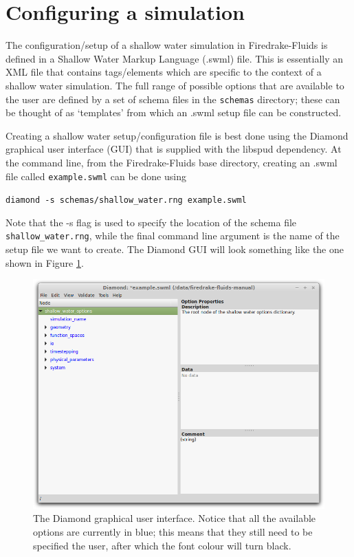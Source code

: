 \documentclass[a4paper,11pt]{report}
\begin{document}
\section{Configuring a simulation}\label{sect:configuring_a_simulation}
The configuration/setup of a shallow water simulation in Firedrake-Fluids is defined in a Shallow Water Markup Language (.swml) file. This is essentially an XML file that contains tags/elements which are specific to the context of a shallow water simulation. The full range of possible options that are available to the user are defined by a set of schema files in the \texttt{schemas} directory; these can be thought of as `templates' from which an .swml setup file can be constructed.

Creating a shallow water setup/configuration file is best done using the Diamond graphical user interface (GUI) \citep{Ham_etal_2009} that is supplied with the libspud dependency. At the command line, from the Firedrake-Fluids base directory, creating an .swml file called \texttt{example.swml} can be done using

\texttt{diamond -s schemas/shallow\_water.rng example.swml}

Note that the -s flag is used to specify the location of the schema file \texttt{shallow\_water.rng}, while the final command line argument is the name of the setup file we want to create. The Diamond GUI will look something like the one shown in Figure \ref{fig:diamond}.

\begin{figure}[!ht]
   \centering
   \includegraphics[width=1\columnwidth]{images/diamond.png}
   \caption{The Diamond \citep{Ham_etal_2009} graphical user interface. Notice that all the available options are currently in blue; this means that they still need to be specified the user, after which the font colour will turn black.}
   \label{fig:diamond}
\end{figure}
\end{document}

